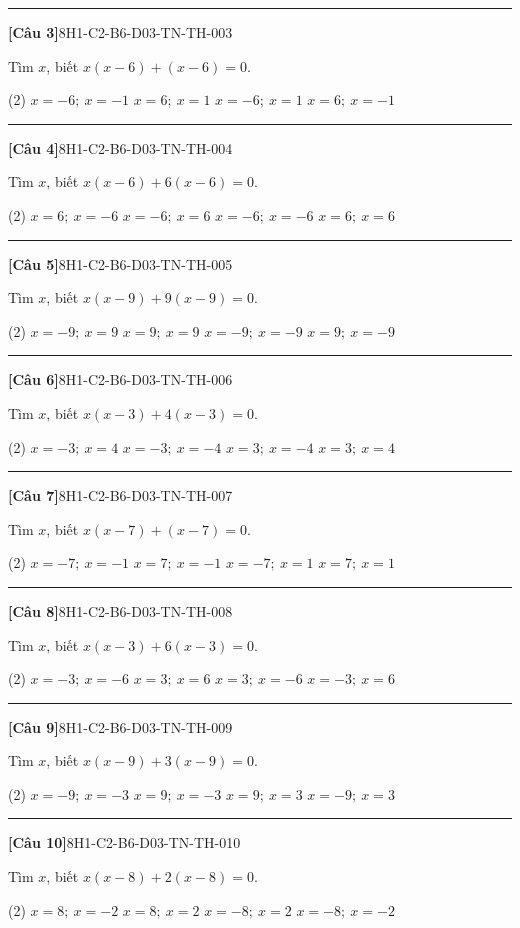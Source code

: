 \documentclass[12pt,a4paper]{article}
\newif\ifloigiai
\newenvironment{cauhoi}[2]{%
  \par\medskip\noindent\rule{\textwidth}{0.4pt}\par\nopagebreak
  \noindent\textbf{[#1]}\hfill{\scriptsize\ttfamily #2}\par\nopagebreak\smallskip}{\par}
\newcommand{\dapan}[1]{\ifloigiai\par\smallskip\noindent\textit{Đáp án:} \textbf{#1}\par\fi}
\begin{document}
\begin{cauhoi}{Câu 3}{8H1-C2-B6-D03-TN-TH-003}
Tìm $x$, biết $x(x-6)+(x-6)=0$.
\begin{tasks}(2)
\task $x=-6;\ x=-1$
\task $x=6;\ x=1$
\task $x=-6;\ x=1$
\task $x=6;\ x=-1$
\end{tasks}
\dapan{D}
\end{cauhoi}
\begin{cauhoi}{Câu 4}{8H1-C2-B6-D03-TN-TH-004}
Tìm $x$, biết $x(x-6)+6(x-6)=0$.
\begin{tasks}(2)
\task $x=6;\ x=-6$
\task $x=-6;\ x=6$
\task $x=-6;\ x=-6$
\task $x=6;\ x=6$
\end{tasks}
\dapan{A}
\end{cauhoi}
\begin{cauhoi}{Câu 5}{8H1-C2-B6-D03-TN-TH-005}
Tìm $x$, biết $x(x-9)+9(x-9)=0$.
\begin{tasks}(2)
\task $x=-9;\ x=9$
\task $x=9;\ x=9$
\task $x=-9;\ x=-9$
\task $x=9;\ x=-9$
\end{tasks}
\dapan{D}
\end{cauhoi}
\begin{cauhoi}{Câu 6}{8H1-C2-B6-D03-TN-TH-006}
Tìm $x$, biết $x(x-3)+4(x-3)=0$.
\begin{tasks}(2)
\task $x=-3;\ x=4$
\task $x=-3;\ x=-4$
\task $x=3;\ x=-4$
\task $x=3;\ x=4$
\end{tasks}
\dapan{C}
\end{cauhoi}
\begin{cauhoi}{Câu 7}{8H1-C2-B6-D03-TN-TH-007}
Tìm $x$, biết $x(x-7)+(x-7)=0$.
\begin{tasks}(2)
\task $x=-7;\ x=-1$
\task $x=7;\ x=-1$
\task $x=-7;\ x=1$
\task $x=7;\ x=1$
\end{tasks}
\dapan{B}
\end{cauhoi}
\begin{cauhoi}{Câu 8}{8H1-C2-B6-D03-TN-TH-008}
Tìm $x$, biết $x(x-3)+6(x-3)=0$.
\begin{tasks}(2)
\task $x=-3;\ x=-6$
\task $x=3;\ x=6$
\task $x=3;\ x=-6$
\task $x=-3;\ x=6$
\end{tasks}
\dapan{C}
\end{cauhoi}
\begin{cauhoi}{Câu 9}{8H1-C2-B6-D03-TN-TH-009}
Tìm $x$, biết $x(x-9)+3(x-9)=0$.
\begin{tasks}(2)
\task $x=-9;\ x=-3$
\task $x=9;\ x=-3$
\task $x=9;\ x=3$
\task $x=-9;\ x=3$
\end{tasks}
\dapan{B}
\end{cauhoi}
\begin{cauhoi}{Câu 10}{8H1-C2-B6-D03-TN-TH-010}
Tìm $x$, biết $x(x-8)+2(x-8)=0$.
\begin{tasks}(2)
\task $x=8;\ x=-2$
\task $x=8;\ x=2$
\task $x=-8;\ x=2$
\task $x=-8;\ x=-2$
\end{tasks}
\dapan{A}
\end{cauhoi}
\end{document}

